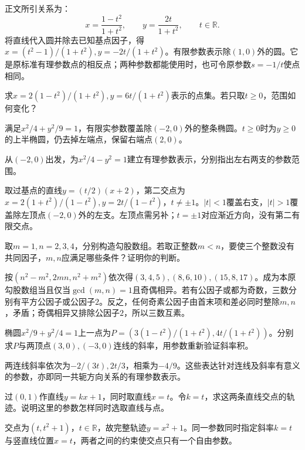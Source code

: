 \par\smallskip\noindent 正文所引关系为：
\begin{equation*}
x=\frac{1-t^2}{1+t^2},\qquad
    y=\frac{2t}{1+t^2},\qquad t\in\mathbb R .
\end{equation*}
\solutionanswer
将直线代入圆并除去已知基点因子，得\(x=(t^2-1)/(1+t^2),y=-2t/(1+t^2)\)。有限参数表示除\((1,0)\)外的圆。它是原标准有理参数点的相反点；两种参数都能使用时，也可令原参数\(s=-1/t\)使点相同。


求\(x=2(1-t^2)/(1+t^2),y=6t/(1+t^2)\)表示的点集。若只取\(t\ge0\)，范围如何变化？
\par
\solutionanswer
满足\(x^2/4+y^2/9=1\)，有限实参数覆盖除\((-2,0)\)外的整条椭圆。\(t\ge0\)时为\(y\ge0\)的上半椭圆，仍去掉左端点，保留右端点\((2,0)\)。


从\((-2,0)\)出发，为\(x^2/4-y^2=1\)建立有理参数表示，分别指出左右两支的参数范围。
\par
\solutionanswer
取过基点的直线\(y=(t/2)(x+2)\)，第二交点为\(x=2(1+t^2)/(1-t^2),y=2t/(1-t^2)\)，\(t\ne\pm1\)。\(|t|<1\)覆盖右支，\(|t|>1\)覆盖除左顶点\((-2,0)\)外的左支。左顶点需另补；\(t=\pm1\)对应渐近方向，没有第二有限交点。


取\(m=1,n=2,3,4\)，分别构造勾股数组。若取正整数\(m<n\)，要使三个整数没有共同因子，\(m,n\)应满足哪些条件？证明你的判断。
\par
\solutionanswer
按\((n^2-m^2,2mn,n^2+m^2)\)依次得\((3,4,5),(8,6,10),(15,8,17)\)。成为本原勾股数组当且仅当\(\gcd(m,n)=1\)且奇偶相异。若有公因子或都为奇数，三数分别有平方公因子或公因子\(2\)。反之，任何奇素公因子由首末项和差必同时整除\(m,n\)，矛盾；奇偶相异又排除公因子\(2\)，所以三数互素。


椭圆\(x^2/9+y^2/4=1\)上一点为\(P=(3(1-t^2)/(1+t^2),4t/(1+t^2))\)。分别求\(P\)与两顶点\((3,0),(-3,0)\)连线的斜率，用参数重新验证斜率积。
\par
\solutionanswer
两连线斜率依次为\(-2/(3t),2t/3\)，相乘为\(-4/9\)。这些表达针对连线及斜率有意义的参数，亦即同一共轭方向关系的有理参数表示。


过\((0,1)\)作直线\(y=kx+1\)，同时取直线\(x=t\)。令\(k=t\)，求这两条直线交点的轨迹。说明这里的参数怎样同时选取直线与点。
\par
\solutionanswer
交点为\((t,t^2+1)\)，\(t\in\mathbb R\)，故完整轨迹\(y=x^2+1\)。同一参数同时指定斜率\(k=t\)与竖直线位置\(x=t\)，两者之间的约束使交点只有一个自由参数。


